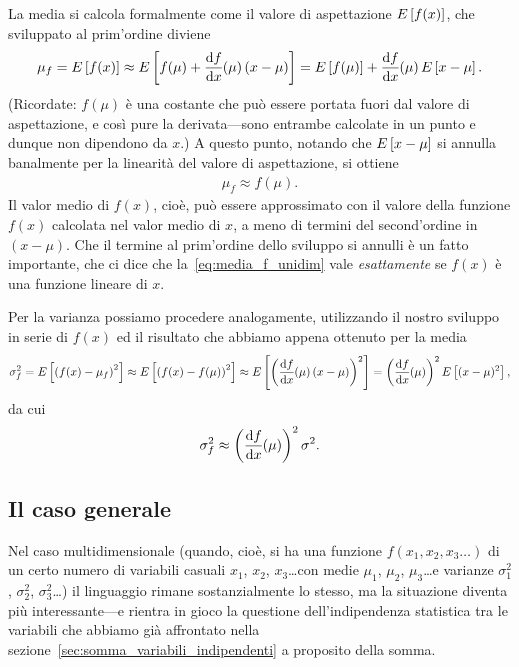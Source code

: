 La media si calcola formalmente come il valore di aspettazione $\displaystyle E\left[f(x)\right]$,
che sviluppato al prim'ordine diviene
\begin{align*}
  \mu_f = \expect{f(x)} \approx \expect{f(\mu) +
    \td{f}{x}{\mu}(x - \mu)} =
  \expect{f(\mu)} + \td{f}{x}{\mu}\expect{x - \mu}.
\end{align*}
(Ricordate: $f(\mu)$ è una costante che può essere portata fuori dal
valore di aspettazione, e così pure la derivata---sono entrambe calcolate in
un punto e dunque non dipendono da $x$.) A questo punto, notando che
$\displaystyle E\left[x - \mu\right]$ si annulla banalmente per la linearità del valore di
aspettazione, si ottiene
\begin{align}\label{eq:media_f_unidim}
  \mu_f \approx f(\mu).
\end{align}
Il valor medio di $f(x)$, cioè, può essere approssimato con il valore della
funzione $f(x)$ calcolata nel valor medio di $x$, a meno di termini del
second'ordine in $(x - \mu)$. Che il termine al prim'ordine dello sviluppo si
annulli è un fatto importante, che ci dice che la~\eqref{eq:media_f_unidim}
vale \emph{esattamente} se $f(x)$ è una funzione lineare di $x$.

Per la varianza possiamo procedere analogamente, utilizzando il nostro
sviluppo in serie di $f(x)$ ed il risultato che abbiamo appena ottenuto per la
media
\begin{align*}
  \sigma^2_f = \expect{\left(f(x) - \mu_f\right)^2} \approx
  \expect{\left(f(x) - f(\mu)\right)^2} \approx
  \expect{\left(\td{f}{x}{\mu}(x - \mu)\right)^2} =
  \left(\td{f}{x}{\mu}\right)^2\expect{(x - \mu)^2},
\end{align*}
da cui
\begin{align}\label{eq:sigma_f_unidim}
  \sigma^2_f \approx \left(\td{f}{x}{\mu}\right)^2\sigma^2.
\end{align}


\subsection{Il caso generale}

Nel caso multidimensionale (quando, cioè, si ha una funzione
$f(x_1, x_2, x_3\ldots)$ di un certo numero di variabili casuali $x_1$,  $x_2$,
$x_3$\ldots con medie $\mu_1$, $\mu_2$, $\mu_3$\dots e varianze
$\sigma^2_1$, $\sigma^2_2$, $\sigma^2_3$\dots)
il linguaggio rimane sostanzialmente lo stesso, ma la situazione diventa più
interessante---e rientra in gioco la questione dell'indipendenza statistica tra
le variabili che abbiamo già affrontato nella
sezione~\ref{sec:somma_variabili_indipendenti} a proposito della somma.

